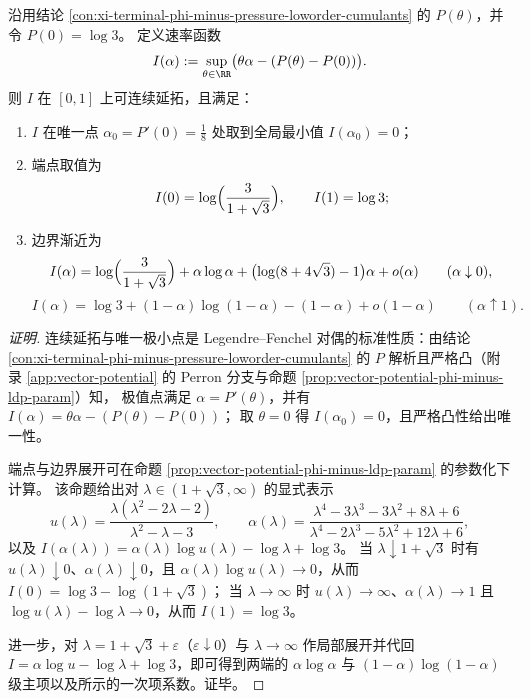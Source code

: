 \begin{conclusion}\label{con:xi-terminal-phi-minus-rate-endpoints-boundary-asymptotics}
沿用结论 \ref{con:xi-terminal-phi-minus-pressure-loworder-cumulants} 的 \(P(\theta)\)，并令 \(P(0)=\log 3\)。
定义速率函数
\[
I(\alpha):=\sup_{\theta\in\RR}\bigl(\theta\alpha-(P(\theta)-P(0))\bigr).
\]
则 \(I\) 在 \([0,1]\) 上可连续延拓，且满足：
\begin{enumerate}
  \item \(I\) 在唯一点 \(\alpha_{0}=P'(0)=\frac18\) 处取到全局最小值 \(I(\alpha_{0})=0\)；
  \item 端点取值为
  \[
  I(0)=\log\Bigl(\frac{3}{1+\sqrt3}\Bigr),\qquad
  I(1)=\log 3;
  \]
  \item 边界渐近为
  \[
  I(\alpha)=\log\Bigl(\frac{3}{1+\sqrt3}\Bigr)+\alpha\log\alpha+\bigl(\log(8+4\sqrt3)-1\bigr)\alpha+o(\alpha)
  \qquad (\alpha\downarrow 0),
  \]
  \[
  I(\alpha)=\log 3+(1-\alpha)\log(1-\alpha)-(1-\alpha)+o(1-\alpha)
  \qquad (\alpha\uparrow 1).
  \]
\end{enumerate}
\end{conclusion}
\begin{proof}[证明]
连续延拓与唯一极小点是 Legendre--Fenchel 对偶的标准性质：由结论 \ref{con:xi-terminal-phi-minus-pressure-loworder-cumulants} 的 \(P\) 解析且严格凸（附录 \ref{app:vector-potential} 的 Perron 分支与命题 \ref{prop:vector-potential-phi-minus-ldp-param}）知，
极值点满足 \(\alpha=P'(\theta)\)，并有 \(I(\alpha)=\theta\alpha-(P(\theta)-P(0))\)；
取 \(\theta=0\) 得 \(I(\alpha_{0})=0\)，且严格凸性给出唯一性。
\par
端点与边界展开可在命题 \ref{prop:vector-potential-phi-minus-ldp-param} 的参数化下计算。
该命题给出对 \(\lambda\in(1+\sqrt3,\infty)\) 的显式表示
\[
u(\lambda)=\frac{\lambda(\lambda^{2}-2\lambda-2)}{\lambda^{2}-\lambda-3},
\qquad
\alpha(\lambda)=\frac{\lambda^{4}-3\lambda^{3}-3\lambda^{2}+8\lambda+6}{\lambda^{4}-2\lambda^{3}-5\lambda^{2}+12\lambda+6},
\]
以及
\(
I(\alpha(\lambda))=\alpha(\lambda)\log u(\lambda)-\log\lambda+\log 3
\)。
当 \(\lambda\downarrow 1+\sqrt3\) 时有 \(u(\lambda)\downarrow 0\)、\(\alpha(\lambda)\downarrow 0\)，且
\(
\alpha(\lambda)\log u(\lambda)\to 0
\)，从而
\(
I(0)=\log 3-\log(1+\sqrt3)
\)；
当 \(\lambda\to\infty\) 时 \(u(\lambda)\to\infty\)、\(\alpha(\lambda)\to 1\) 且 \(\log u(\lambda)-\log\lambda\to 0\)，从而 \(I(1)=\log 3\)。
\par
进一步，对 \(\lambda=1+\sqrt3+\varepsilon\)（\(\varepsilon\downarrow 0\)）与 \(\lambda\to\infty\) 作局部展开并代回
\(
I=\alpha\log u-\log\lambda+\log 3
\)，即可得到两端的
\(\alpha\log\alpha\) 与 \((1-\alpha)\log(1-\alpha)\) 级主项以及所示的一次项系数。证毕。
\end{proof}

